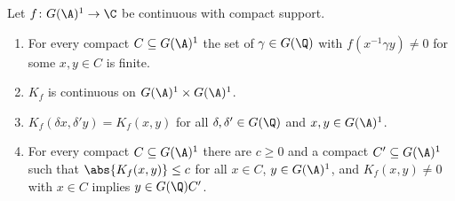 Let $f\colon G(\A)^1\to\C$ be continuous with compact support.
\begin{enumerate}
  \item[(a)] For every compact $C\subseteq G(\A)^1$ the set of $\gamma\in G(\Q)$ with $f(x^{-1}\gamma y)\neq0$ for some $x,y\in C$ is finite.
  \item[(b)] $K_f$ is continuous on $G(\A)^1\times G(\A)^1$.
  \item[(c)] $K_f(\delta x,\delta'y)=K_f(x,y)$ for all $\delta,\delta'\in G(\Q)$ and $x,y\in G(\A)^1$.
  \item[(d)] For every compact $C\subseteq G(\A)^1$ there are $c\ge0$ and a compact $C'\subseteq G(\A)^1$ such that
  $\abs{K_f(x,y)}\le c$ for all $x\in C$, $y\in G(\A)^1$, and $K_f(x,y)\neq0$ with $x\in C$ implies $y\in G(\Q)C'$.
\end{enumerate}
